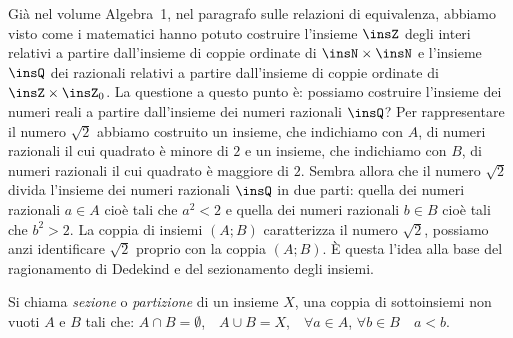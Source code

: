 Già nel volume Algebra~1, nel paragrafo sulle relazioni di equivalenza, abbiamo visto come i matematici hanno potuto costruire l'insieme $\insZ$ degli interi relativi a partire dall'insieme di coppie ordinate di $\insN \times \insN$ e l'insieme $\insQ$ dei razionali relativi a partire dall'insieme di coppie ordinate di $\insZ \times \insZ_{0}$.
La questione a questo punto è: possiamo costruire l'insieme dei numeri reali a partire dall'insieme dei numeri razionali $\insQ$? Per rappresentare il numero $\sqrt{2}$ abbiamo costruito un insieme, che indichiamo con $A$, di numeri razionali il cui quadrato è minore di $2$ e un insieme, che indichiamo con $B$, di numeri razionali il cui quadrato è maggiore di $2$. Sembra allora che il numero $\sqrt{2}$ divida l'insieme dei numeri razionali $\insQ$ in due parti: quella dei numeri razionali $a\in A$ cioè tali che $a^{2}<2$ e quella dei numeri razionali $b\in B$ cioè tali che $b^{2}>2$. La coppia di insiemi $(A;B)$ caratterizza il numero $\sqrt{2}$, possiamo anzi identificare $\sqrt{2}$ proprio con la coppia $(A;B)$.
È questa l'idea alla base del ragionamento di Dedekind e del sezionamento degli insiemi.

\begin{definizione}
Si chiama \emph{sezione} o \emph{partizione} di un insieme $X$, una coppia di sottoinsiemi non vuoti $A$ e $B$ tali che: $A \cap B=\emptyset$,~~$A \cup B=X$,~~$\forall a \in A$, $\forall b \in B$~~$a<b$.
 \end{definizione}

